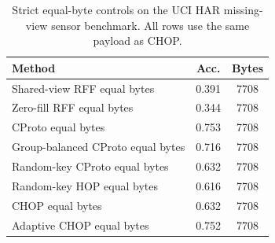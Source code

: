 \begin{table}[t]
\centering
\caption{Strict equal-byte controls on the UCI HAR missing-view sensor benchmark. All rows use the same payload as CHOP.}
\label{tab:strict-equal-byte}
\begin{tabular}{lcc}
\toprule
Method & Acc. & Bytes \\
\midrule
Shared-view RFF equal bytes & 0.391 & 7708 \\
Zero-fill RFF equal bytes & 0.344 & 7708 \\
CProto equal bytes & 0.753 & 7708 \\
Group-balanced CProto equal bytes & 0.716 & 7708 \\
Random-key CProto equal bytes & 0.632 & 7708 \\
Random-key HOP equal bytes & 0.616 & 7708 \\
CHOP equal bytes & 0.632 & 7708 \\
Adaptive CHOP equal bytes & 0.752 & 7708 \\
\bottomrule
\end{tabular}
\end{table}
